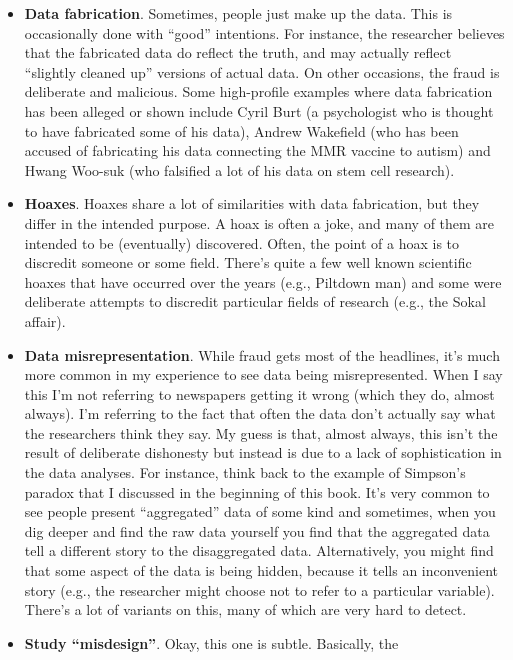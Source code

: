 \documentclass[
  a4paper,
]{book}
\providecommand{\tightlist}{%
  \setlength{\itemsep}{0pt}\setlength{\parskip}{0pt}}
\begin{document}
\begin{itemize}
\tightlist
\item
  \textbf{Data fabrication}. Sometimes, people just make up the data.
  This is occasionally done with ``good'' intentions. For instance, the
  researcher believes that the fabricated data do reflect the truth, and
  may actually reflect ``slightly cleaned up'' versions of actual data.
  On other occasions, the fraud is deliberate and malicious. Some
  high-profile examples where data fabrication has been alleged or shown
  include Cyril Burt (a psychologist who is thought to have fabricated
  some of his data), Andrew Wakefield (who has been accused of
  fabricating his data connecting the MMR vaccine to autism) and Hwang
  Woo-suk (who falsified a lot of his data on stem cell research).
\item
  \textbf{Hoaxes}. Hoaxes share a lot of similarities with data
  fabrication, but they differ in the intended purpose. A hoax is often
  a joke, and many of them are intended to be (eventually) discovered.
  Often, the point of a hoax is to discredit someone or some field.
  There's quite a few well known scientific hoaxes that have occurred
  over the years (e.g., Piltdown man) and some were deliberate attempts
  to discredit particular fields of research (e.g., the Sokal affair).
\item
  \textbf{Data misrepresentation}. While fraud gets most of the
  headlines, it's much more common in my experience to see data being
  misrepresented. When I say this I'm not referring to newspapers
  getting it wrong (which they do, almost always). I'm referring to the
  fact that often the data don't actually say what the researchers think
  they say. My guess is that, almost always, this isn't the result of
  deliberate dishonesty but instead is due to a lack of sophistication
  in the data analyses. For instance, think back to the example of
  Simpson's paradox that I discussed in the beginning of this book. It's
  very common to see people present ``aggregated'' data of some kind and
  sometimes, when you dig deeper and find the raw data yourself you find
  that the aggregated data tell a different story to the disaggregated
  data. Alternatively, you might find that some aspect of the data is
  being hidden, because it tells an inconvenient story (e.g., the
  researcher might choose not to refer to a particular variable).
  There's a lot of variants on this, many of which are very hard to
  detect.
\item
  \textbf{Study ``misdesign''}. Okay, this one is subtle. Basically, the

\end{itemize}
\end{document}
